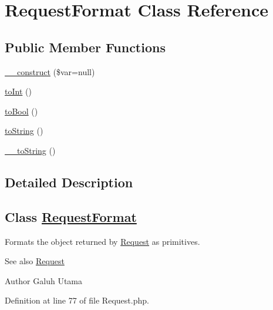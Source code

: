 \hypertarget{class_request_format}{\section{\-Request\-Format \-Class \-Reference}
\label{class_request_format}
}
\subsection*{\-Public \-Member \-Functions}
\begin{DoxyCompactItemize}
\item 
\hyperlink{class_request_format_aebe66bdef41b368855e3b428bf04cd9f}{\-\_\-\-\_\-construct} (\$var=null)
\item 
\hyperlink{class_request_format_af925bcc620434a34f7ee4029b0700765}{to\-Int} ()
\item 
\hyperlink{class_request_format_a4e162ae0ba86c42acea36eb24bd2b1b6}{to\-Bool} ()
\item 
\hyperlink{class_request_format_a5558c5d549f41597377fa1ea8a1cefa3}{to\-String} ()
\item 
\hyperlink{class_request_format_a7516ca30af0db3cdbf9a7739b48ce91d}{\-\_\-\-\_\-to\-String} ()
\end{DoxyCompactItemize}


\subsection{\-Detailed \-Description}
\subsection*{\-Class \hyperlink{class_request_format}{\-Request\-Format}}

\-Formats the object returned by \hyperlink{class_request}{\-Request} as primitives.

\begin{DoxySeeAlso}{\-See also}
\hyperlink{class_request}{\-Request}
\end{DoxySeeAlso}
\begin{DoxyAuthor}{\-Author}
\-Galuh \-Utama 
\end{DoxyAuthor}


\-Definition at line 77 of file \-Request.\-php.



